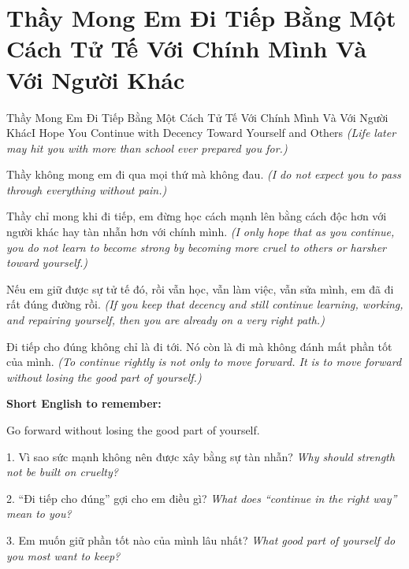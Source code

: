 \section{Thầy Mong Em Đi Tiếp Bằng Một Cách Tử Tế Với Chính Mình Và Với Người Khác}
\begin{truyen}{Thầy Mong Em Đi Tiếp Bằng Một Cách Tử Tế Với Chính Mình Và Với Người Khác}{I Hope You Continue with Decency Toward Yourself and Others}
\textit{(Life later may hit you with more than school ever prepared you for.)}

Thầy không mong em đi qua mọi thứ mà không đau.
\textit{(I do not expect you to pass through everything without pain.)}

Thầy chỉ mong khi đi tiếp, em đừng học cách mạnh lên bằng cách độc hơn với người khác hay tàn nhẫn hơn với chính mình.
\textit{(I only hope that as you continue, you do not learn to become strong by becoming more cruel to others or harsher toward yourself.)}

Nếu em giữ được sự tử tế đó, rồi vẫn học, vẫn làm việc, vẫn sửa mình, em đã đi rất đúng đường rồi.
\textit{(If you keep that decency and still continue learning, working, and repairing yourself, then you are already on a very right path.)}
\end{truyen}

\begin{baihoc}
Đi tiếp cho đúng không chỉ là đi tới. Nó còn là đi mà không đánh mất phần tốt của mình.
\textit{(To continue rightly is not only to move forward. It is to move forward without losing the good part of yourself.)}
\end{baihoc}

\begin{ghinhoanh}
\textbf{Short English to remember:}

Go forward without losing the good part of yourself.

\end{ghinhoanh}

\begin{tuhocnhanh}
1. Vì sao sức mạnh không nên được xây bằng sự tàn nhẫn? \textit{Why should strength not be built on cruelty?}

2. “Đi tiếp cho đúng” gợi cho em điều gì? \textit{What does “continue in the right way” mean to you?}

3. Em muốn giữ phần tốt nào của mình lâu nhất? \textit{What good part of yourself do you most want to keep?}
\end{tuhocnhanh}
\ngancach
